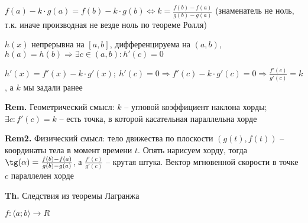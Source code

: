 \documentclass[14pt, letter paper]{article}
\newcommand{\q}[1]{\langle #1 \rangle}
\begin{document}
$f(a) - k \cdot g(a) = f(b) - k \cdot g(b) \Leftrightarrow k = \frac{f(b) - f(a)}{g(b) - g(a)}$ (знаменатель не ноль, т.к. иначе производная не везде ноль по теореме Ролля)

$h(x)$ непрерывна на $[a,b]$, дифференцируема на $(a, b)$, $h(a) = h(b) \Rightarrow \exists c \in (a, b) : h'(c) = 0$

$h'(x) = f'(x) - k \cdot g'(x);\ h'(c) = 0 \Rightarrow f'(c) - k \cdot g'(c) = 0 \Rightarrow \frac{f'(c)}{g'(c)} = k$, а $k$ мы задали ранее

\vspace{2mm}

\textbf{Rem.} Геометрический смысл: $k$ -- угловой коэффициент наклона хорды; $\exists c : f'(c) = k$ -- есть точка, в которой касательная параллельна хорде

\vspace{2mm}

\textbf{Rem2.} Физический смысл: тело движества по плоскости $(g(t), f(t))$ -- координаты тела в момент времени $t$. Опять нарисуем хорду, тогда $\tg(\alpha) = \frac{f(b) - f(a)}{g(b) - g(a)}$, а $\frac{f'(c)}{g'(c)}$ -- крутая штука. Вектор мгновенной скорости в точке $c$ параллелен хорде

\vspace{5mm}

\textbf{Th.} Следствия из теоремы Лагранжа

$f : \q{a; b} \rightarrow R$
\end{document}
